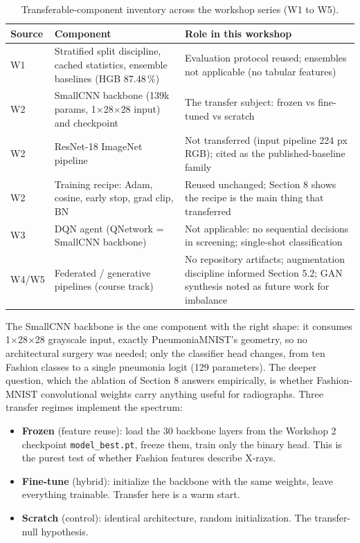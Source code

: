 \documentclass[11pt,a4paper]{article}
\begin{document}
\begin{table}[h]
\centering
\caption{Transferable-component inventory across the workshop series (W1 to W5).}
\label{tab:components}
\small
\begin{tabular}{lp{6.2cm}p{5.2cm}}
\toprule
Source & Component & Role in this workshop \\
\midrule
W1 & Stratified split discipline, cached statistics, ensemble baselines (HGB 87.48\,\%) & Evaluation protocol reused; ensembles not applicable (no tabular features) \\
W2 & SmallCNN backbone (139k params, 1$\times$28$\times$28 input) and checkpoint & The transfer subject: frozen vs fine-tuned vs scratch \\
W2 & ResNet-18 ImageNet pipeline & Not transferred (input pipeline 224 px RGB); cited as the published-baseline family \\
W2 & Training recipe: Adam, cosine, early stop, grad clip, BN & Reused unchanged; Section 8 shows the recipe is the main thing that transferred \\
W3 & DQN agent (QNetwork = SmallCNN backbone) & Not applicable: no sequential decisions in screening; single-shot classification \\
W4/W5 & Federated / generative pipelines (course track) & No repository artifacts; augmentation discipline informed Section 5.2; GAN synthesis noted as future work for imbalance \\
\bottomrule
\end{tabular}
\end{table}

The SmallCNN backbone is the one component with the right shape: it consumes 1$\times$28$\times$28 grayscale input, exactly PneumoniaMNIST's geometry, so no architectural surgery was needed; only the classifier head changes, from ten Fashion classes to a single pneumonia logit (129 parameters). The deeper question, which the ablation of Section 8 answers empirically, is whether Fashion-MNIST convolutional weights carry anything useful for radiographs. Three transfer regimes implement the spectrum:

\begin{itemize}
\item \textbf{Frozen} (feature reuse): load the 30 backbone layers from the Workshop 2 checkpoint \texttt{model\_best.pt}, freeze them, train only the binary head. This is the purest test of whether Fashion features describe X-rays.
\item \textbf{Fine-tune} (hybrid): initialize the backbone with the same weights, leave everything trainable. Transfer here is a warm start.
\item \textbf{Scratch} (control): identical architecture, random initialization. The transfer-null hypothesis.
\end{itemize}
\end{document}
